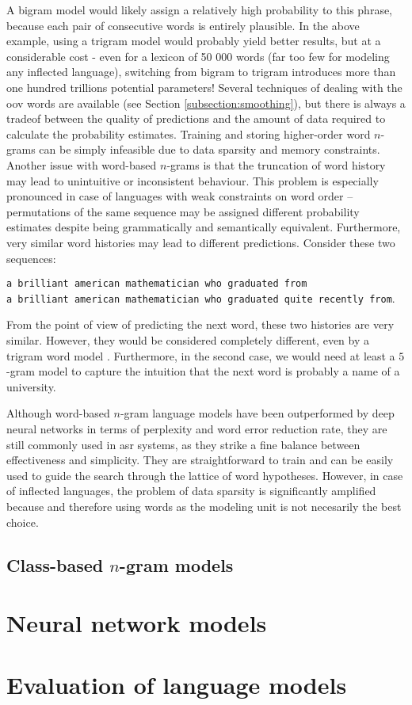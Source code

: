 A bigram model would likely assign a relatively high probability to this phrase, because each pair of consecutive words is entirely plausible. 
In the above example, using a trigram model would probably yield better results, but at a considerable cost - even for a lexicon of 50 000 words (far too few for modeling any inflected language), switching from bigram to trigram introduces more than one hundred trillions potential parameters! Several techniques of dealing with the \gls{oov} words are available (see Section \ref{subsection:smoothing}), but there is always a tradeof between the quality of predictions and the amount of data required to calculate the probability estimates. Training and storing higher-order word $n$-grams can be simply infeasible due to data sparsity and memory constraints.
Another issue with word-based $n$-grams is that the truncation of word history may lead to unintuitive or inconsistent behaviour. This problem is especially pronounced in case of languages with weak constraints on word order -- permutations of the same sequence may be assigned different probability estimates despite being grammatically and semantically equivalent. Furthermore, very similar word histories may lead to different predictions. Consider these two sequences:
\begin{center}
	\texttt{a brilliant american mathematician who graduated from} \\
	\texttt{a brilliant american mathematician who graduated quite recently from}.
\end{center}
From the point of view of predicting the next word, these two histories are very similar. However, they would be considered completely different, even by a trigram word model \cite{whittaker2000statistical}. Furthermore, in the second case, we would need at least a $5$-gram model to capture the intuition that the next word is probably a name of a university.

Although word-based $n$-gram language models have been outperformed by deep neural networks in terms of perplexity and word error reduction rate, they are still commonly used in \gls{asr} systems, as they strike a fine balance between effectiveness and simplicity. They are straightforward to train and can be easily used to guide the search through the lattice of word hypotheses. However, in case of inflected languages, the problem of data sparsity is significantly amplified because and therefore using words as the modeling unit is not necesarily the best choice.
\subsection{Class-based $n$-gram models}
\section{Neural network models}
\label{section:ann}
\section{Evaluation of language models}
\label{section:evaluation}



